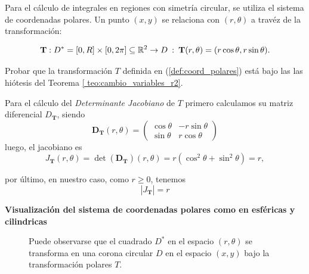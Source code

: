 Para el cálculo de integrales en regiones con simetría circular, se utiliza el sistema de coordenadas polares. Un punto $(x, y)$ se relaciona con $(r, \theta)$ a trav\'ez de  la transformaci\'on:

\begin{equation} \label{def:coord_polares}
\mathbf{T}:D^*=[0,R]\times[0, 2\pi] \subseteq\mathbb{R}^2 \to D\: : \: \mathbf{T}(r, \theta ) =( r \cos \theta , r \sin \theta ).
\end{equation} 

\begin{tarea} Probar que la transformaci\'on $T$ definida en (\ref{def:coord_polares}) est\'a bajo las las hi\'otesis del Teorema   \ref{ teo:cambio_variables_r2}.
\end{tarea}

\vspace{0.2cm}

Para el c\'alculo del \emph{Determinante Jacobiano} de $T$  primero  calculamos su  matriz diferencial $D_\mathbf{T}$, siendo
       \begin{equation*}
       \boldsymbol{D}_{\mathbf{T}}(r, \theta) 
       =
       \begin{pmatrix}
       \cos\theta & -r\sin\theta \\
       \sin\theta & r\cos\theta
       \end{pmatrix}
      \end{equation*}
   luego, el jacobiano es
       \begin{equation*}
       J_{\mathbf{T}}(r, \theta) = \det(\boldsymbol{D}_{\mathbf{T}})(r, \theta) = 
      r(\cos^2\theta + \sin^2\theta) = r,
      \end{equation*} 
  
por \'ultimo,  en nuestro caso,  como $r \geq 0$, tenemos
\begin{equation}\label{ejemplo_jacobiano_polares}
|J_{\mathbf{T}}| = r
\end{equation}

\clearpage

\textbf{Visualización del sistema de coordenadas polares como en esféricas y cilindricas}
\begin{figure}[htbp]
    \centering
     
    \label{fig:Visualizacion polares}
    \caption{Puede observarse que el cuadrado $D^*$ en el espacio $(r,\theta)$ se transforma en una corona circular $D$ en el espacio $(x,y)$ bajo la transformaci\'on polares $T$.}
\end{figure}


